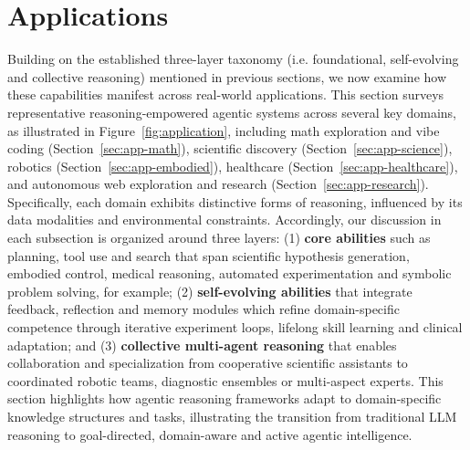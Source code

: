 
\section{Applications}
\label{sec:applications}


Building on the established three-layer taxonomy (i.e. foundational, self-evolving and collective reasoning) mentioned in previous sections, we now examine how these capabilities manifest across real-world applications.
This section surveys representative reasoning-empowered agentic systems across several key domains, as illustrated in Figure~\ref{fig:application}, including math exploration and vibe coding (Section~\ref{sec:app-math}), scientific discovery (Section~\ref{sec:app-science}), robotics (Section~\ref{sec:app-embodied}),  healthcare (Section~\ref{sec:app-healthcare}), and autonomous web exploration and research (Section~\ref{sec:app-research}). Specifically, each domain exhibits distinctive forms of reasoning, influenced by its data modalities and environmental constraints.
Accordingly, our discussion in each subsection is organized around three layers:
(1) \textbf{core abilities} such as planning, tool use and search that span scientific hypothesis generation, embodied control, medical reasoning, automated experimentation and symbolic problem solving, for example;
(2) \textbf{self-evolving abilities} that integrate feedback, reflection and memory modules which refine domain-specific competence through iterative experiment loops, lifelong skill learning and clinical adaptation; and
(3) \textbf{collective multi-agent reasoning} that enables collaboration and specialization from cooperative scientific assistants to coordinated robotic teams, diagnostic ensembles or multi-aspect experts. This section highlights how agentic reasoning frameworks adapt to domain-specific knowledge structures and tasks, illustrating the transition from traditional LLM reasoning to goal-directed, domain-aware and active agentic intelligence. 












